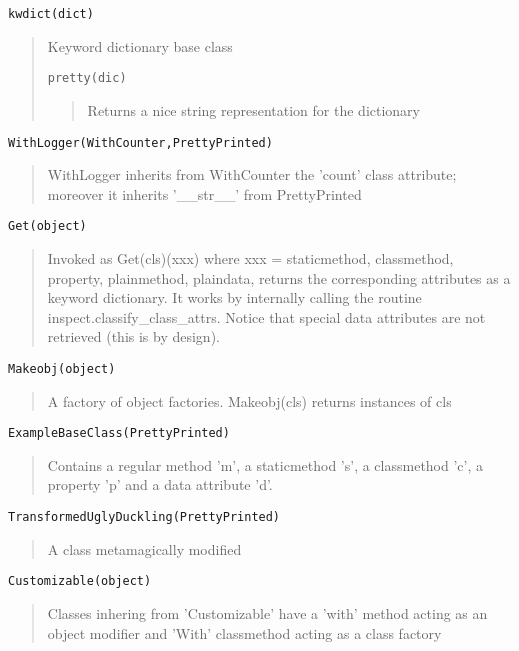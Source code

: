 \documentclass[10pt,english]{article}
\begin{document}
\texttt{kwdict(dict)}
\begin{quote}

Keyword dictionary base class

\texttt{pretty(dic)}
\begin{quote}

Returns a nice string representation for the dictionary
\end{quote}
\end{quote}

\texttt{WithLogger(WithCounter,PrettyPrinted)}
\begin{quote}

WithLogger inherits from WithCounter the 'count' class attribute; 
moreover it inherits '{\_}{\_}str{\_}{\_}' from PrettyPrinted
\end{quote}

\texttt{Get(object)}
\begin{quote}

Invoked as Get(cls)(xxx) where xxx = staticmethod, classmethod,
property, plainmethod, plaindata, returns the corresponding 
attributes as a keyword dictionary. It works by internally calling 
the routine inspect.classify{\_}class{\_}attrs. Notice that special data
attributes are not retrieved (this is by design).
\end{quote}

\texttt{Makeobj(object)}
\begin{quote}

A factory of object factories. Makeobj(cls) returns instances
of cls
\end{quote}

\texttt{ExampleBaseClass(PrettyPrinted)}
\begin{quote}

Contains a regular method 'm', a staticmethod 's', a classmethod 
'c', a property 'p' and a data attribute 'd'.
\end{quote}

\texttt{TransformedUglyDuckling(PrettyPrinted)}
\begin{quote}

A class metamagically modified
\end{quote}

\texttt{Customizable(object)}
\begin{quote}

Classes inhering from 'Customizable' have a 'with' method acting as
an object modifier and 'With' classmethod acting as a class factory
\end{quote}
\end{document}
